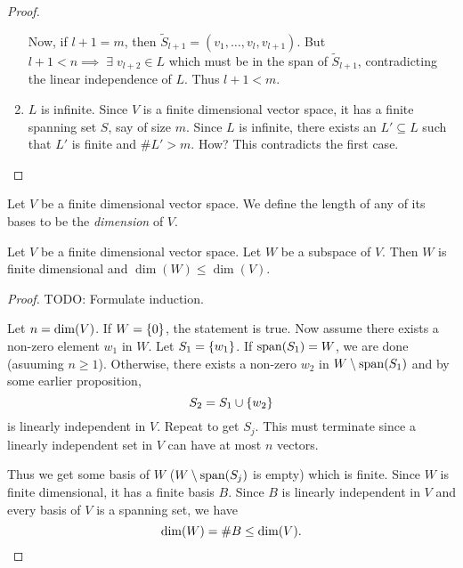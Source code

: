 \begin{proof}
\begin{enumerate}[label=(Case \arabic*)]
        Now, if $l + 1 = m$, then $\tilde{S}_{l + 1} = (v_{1}, \dots, v_{l}, v_{l + 1})$.
        But $l + 1 < n \implies \;\exists\; v_{l + 2} \in L$ which must be in the span of $\tilde{S}_{l + 1}$, contradicting the linear independence of $L$.
        Thus $l + 1 < m$.

        \item $L$ is infinite.
        Since $V$ is a finite dimensional vector space, it has a finite spanning set $S$, say of size $m$.
        Since $L$ is infinite, there exists an $L' \subseteq L$ such that $L'$ is finite and $\#L' > m$. \textcolor{red!70!black}{How?}
        This contradicts the first case. \qedhere
    \end{enumerate}
\end{proof}

\begin{defn}[Dimension] \label{defn:dimension}
    Let $V$ be a finite dimensional vector space.
    We define the length of any of its bases to be the \emph{dimension} of $V$.
\end{defn}

\begin{prop}[] \label{prop:}
    Let $V$ be a finite dimensional vector space.
    Let $W$ be a subspace of $V$.
    Then $W$ is finite dimensional and $\dim(W) \leq \dim(V)$.
\end{prop}
\begin{proof}
    \textcolor{red!70!black}{TODO: Formulate induction}.

    Let $n = \operatorname{dim}(V)$.
    If $W = \set{0}$, the statement is true.
    Now assume there exists a non-zero element $w_{1}$ in $W$.
    Let $S_{1} = \set{w_{1}}$.
    If $\operatorname{span}(S_{1}) = W$, we are done (asuuming $n \geq 1$).
    Otherwise, there exists a non-zero $w_{2}$ in $W \setminus \operatorname{span}(S_{1})$ and by some earlier proposition, \[
        S_{2} = S_{1} \cup \set{w_{2}}
    \] is linearly independent in $V$.
    Repeat to get $S_{j}$.
    This must terminate since a linearly independent set in $V$ can have at most $n$ vectors.

    Thus we get some basis of $W$ ($W \setminus \operatorname{span}(S_{j})$ is empty) which is finite.
    Since $W$ is finite dimensional, it has a finite basis $B$.
    Since $B$ is linearly independent in $V$ and every basis of $V$ is a spanning set, we have \[
        \operatorname{dim}(W) = \#B \leq \operatorname{dim}(V). \qedhere
    \]
\end{proof}

